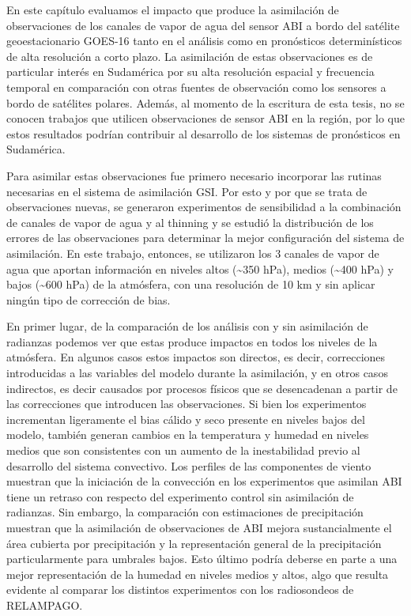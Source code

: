 \documentclass[12pt,oneside,a4paper]{reedthesis}
\begin{document}
En este capítulo evaluamos el impacto que produce la asimilación de observaciones de los canales de vapor de agua del sensor ABI a bordo del satélite geoestacionario GOES-16 tanto en el análisis como en pronósticos determinísticos de alta resolución a corto plazo. La asimilación de estas observaciones es de particular interés en Sudamérica por su alta resolución espacial y frecuencia temporal en comparación con otras fuentes de observación como los sensores a bordo de satélites polares. Además, al momento de la escritura de esta tesis, no se conocen trabajos que utilicen observaciones de sensor ABI en la región, por lo que estos resultados podrían contribuir al desarrollo de los sistemas de pronósticos en Sudamérica.

Para asimilar estas observaciones fue primero necesario incorporar las rutinas necesarias en el sistema de asimilación GSI. Por esto y por que se trata de observaciones nuevas, se generaron experimentos de sensibilidad a la combinación de canales de vapor de agua y al thinning y se estudió la distribución de los errores de las observaciones para determinar la mejor configuración del sistema de asimilación. En este trabajo, entonces, se utilizaron los 3 canales de vapor de agua que aportan información en niveles altos (\textasciitilde350 hPa), medios (\textasciitilde400 hPa) y bajos (\textasciitilde600 hPa) de la atmósfera, con una resolución de 10 km y sin aplicar ningún tipo de corrección de bias.

En primer lugar, de la comparación de los análisis con y sin asimilación de radianzas podemos ver que estas produce impactos en todos los niveles de la atmósfera. En algunos casos estos impactos son directos, es decir, correcciones introducidas a las variables del modelo durante la asimilación, y en otros casos indirectos, es decir causados por procesos físicos que se desencadenan a partir de las correcciones que introducen las observaciones. Si bien los experimentos incrementan ligeramente el bias cálido y seco presente en niveles bajos del modelo, también generan cambios en la temperatura y humedad en niveles medios que son consistentes con un aumento de la inestabilidad previo al desarrollo del sistema convectivo. Los perfiles de las componentes de viento muestran que la iniciación de la convección en los experimentos que asimilan ABI tiene un retraso con respecto del experimento control sin asimilación de radianzas. Sin embargo, la comparación con estimaciones de precipitación muestran que la asimilación de observaciones de ABI mejora sustancialmente el área cubierta por precipitación y la representación general de la precipitación particularmente para umbrales bajos. Esto último podría deberse en parte a una mejor representación de la humedad en niveles medios y altos, algo que resulta evidente al comparar los distintos experimentos con los radiosondeos de RELAMPAGO.
\end{document}
